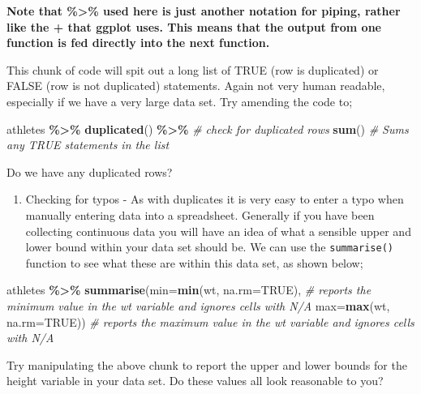 \documentclass[
]{book}
\newenvironment{Shaded}{\begin{snugshade}}{\end{snugshade}}
\newcommand{\AttributeTok}[1]{\textcolor[rgb]{0.13,0.29,0.53}{#1}}
\newcommand{\CommentTok}[1]{\textcolor[rgb]{0.56,0.35,0.01}{\textit{#1}}}
\newcommand{\ConstantTok}[1]{\textcolor[rgb]{0.56,0.35,0.01}{#1}}
\newcommand{\FunctionTok}[1]{\textcolor[rgb]{0.13,0.29,0.53}{\textbf{#1}}}
\newcommand{\NormalTok}[1]{#1}
\newcommand{\SpecialCharTok}[1]{\textcolor[rgb]{0.81,0.36,0.00}{\textbf{#1}}}
\providecommand{\tightlist}{%
  \setlength{\itemsep}{0pt}\setlength{\parskip}{0pt}}
\begin{document}
\textbf{Note that \%\textgreater\% used here is just another notation for piping, rather like the + that ggplot uses. This means that the output from one function is fed directly into the next function.}

This chunk of code will spit out a long list of TRUE (row is duplicated) or FALSE (row is not duplicated) statements. Again not very human readable, especially if we have a very large data set. Try amending the code to;

\begin{Shaded}
\begin{Highlighting}[]
\NormalTok{athletes }\SpecialCharTok{\%\textgreater{}\%}
  \FunctionTok{duplicated}\NormalTok{() }\SpecialCharTok{\%\textgreater{}\%} \CommentTok{\# check for duplicated rows}
  \FunctionTok{sum}\NormalTok{() }\CommentTok{\# Sums any TRUE statements in the list }
\end{Highlighting}
\end{Shaded}

Do we have any duplicated rows?

\begin{enumerate}
\def\labelenumi{\arabic{enumi})}
\setcounter{enumi}{1}
\tightlist
\item
  Checking for typos - As with duplicates it is very easy to enter a typo when manually entering data into a spreadsheet. Generally if you have been collecting continuous data you will have an idea of what a sensible upper and lower bound within your data set should be. We can use the \texttt{summarise()} function to see what these are within this data set, as shown below;
\end{enumerate}

\begin{Shaded}
\begin{Highlighting}[]
\NormalTok{athletes }\SpecialCharTok{\%\textgreater{}\%} 
  \FunctionTok{summarise}\NormalTok{(}\AttributeTok{min=}\FunctionTok{min}\NormalTok{(wt, }\AttributeTok{na.rm=}\ConstantTok{TRUE}\NormalTok{), }\CommentTok{\# reports the minimum value in the wt variable and ignores cells with N/A}
            \AttributeTok{max=}\FunctionTok{max}\NormalTok{(wt, }\AttributeTok{na.rm=}\ConstantTok{TRUE}\NormalTok{)) }\CommentTok{\# reports the maximum value in the wt variable and ignores cells with N/A}
\end{Highlighting}
\end{Shaded}

Try manipulating the above chunk to report the upper and lower bounds for the height variable in your data set. Do these values all look reasonable to you?
\end{document}
